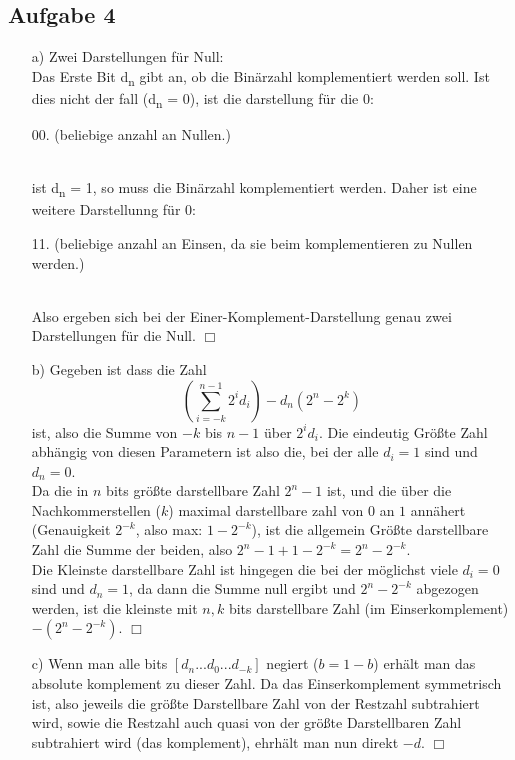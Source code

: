 \documentclass{scrartcl}
\begin{document}
	\subsection*{Aufgabe 4}
		\begin{itemize}

                \item[a)] Zwei Darstellungen für Null:\\
                Das Erste Bit d\textsubscript{n} gibt an, ob die Binärzahl komplementiert werden
                soll. Ist dies nicht der fall (d\textsubscript{n} = 0), ist die darstellung für
                die 0: \\
                \centerline{00. (beliebige anzahl an Nullen.)}\\
                ist d\textsubscript{n} = 1, so muss die Binärzahl komplementiert werden.
                Daher ist eine weitere Darstellunng für 0:\\
                \centerline{11. (beliebige anzahl an Einsen, da sie beim komplementieren zu Nullen
                werden.)}\\
                Also ergeben sich bei der Einer-Komplement-Darstellung genau zwei Darstellungen für
                die Null. \hfill $\Box$

                \item[b)]
                Gegeben ist dass die Zahl $$(\sum^{n-1}_{i=-k}2^i d_i) - d_n(2^n - 2^k)$$ ist,
                also die Summe von $-k$ bis $n-1$ über $2^id_i$. Die eindeutig Größte Zahl abhängig
                von diesen Parametern ist also die, bei der alle $d_i = 1$ sind und $d_n=0$. \\
                Da die in $n$ bits größte darstellbare Zahl $2^n -1$ ist, und die über die
                Nachkommerstellen ($k$) maximal darstellbare zahl von $0$ an $1$ annähert
                (Genauigkeit $2^{-k}$, also max: $1 - 2^{-k}$), ist die allgemein Größte
                darstellbare Zahl die Summe der beiden, also $2^n -1 + 1 - 2^{-k} = 2^n - 2^{-k}$.
                \\

                Die Kleinste darstellbare Zahl ist hingegen die bei der möglichst viele $d_i = 0$
                sind und $d_n = 1$, da dann die Summe null ergibt und $2^n - 2^{-k}$ abgezogen
                werden, ist die kleinste mit $n,k$ bits darstellbare Zahl (im Einserkomplement)
                $-(2^n - 2^{-k})$. \hfill $\Box$


		\item[c)]  %
                Wenn man alle bits $[d_n...d_0...d_{-k}]$ negiert ($b = 1 - b$) erhält man das
                absolute komplement zu dieser Zahl. Da das Einserkomplement symmetrisch ist,
                also jeweils die größte Darstellbare Zahl von der Restzahl subtrahiert wird,
                sowie die Restzahl auch quasi von der größte Darstellbaren
                Zahl subtrahiert wird (das komplement), ehrhält man nun direkt $-d$. \hfill $\Box$
		\end{itemize}
\end{document}
